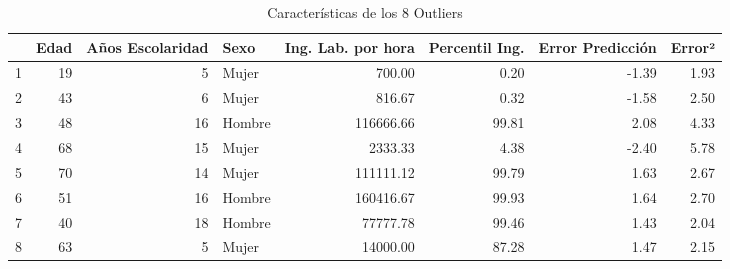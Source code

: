 \begin{table}[ht]
\centering
\begin{tabular}{rrrlrrrr}
  \toprule
 & Edad & Años Escolaridad & Sexo & Ing. Lab. por hora & Percentil Ing. & Error Predicción & Error² \\ 
  \midrule
1 &  19 &   5 & Mujer & 700.00 & 0.20 & -1.39 & 1.93 \\ 
  2 &  43 &   6 & Mujer & 816.67 & 0.32 & -1.58 & 2.50 \\ 
  3 &  48 &  16 & Hombre & 116666.66 & 99.81 & 2.08 & 4.33 \\ 
  4 &  68 &  15 & Mujer & 2333.33 & 4.38 & -2.40 & 5.78 \\ 
  5 &  70 &  14 & Mujer & 111111.12 & 99.79 & 1.63 & 2.67 \\ 
  6 &  51 &  16 & Hombre & 160416.67 & 99.93 & 1.64 & 2.70 \\ 
  7 &  40 &  18 & Hombre & 77777.78 & 99.46 & 1.43 & 2.04 \\ 
  8 &  63 &   5 & Mujer & 14000.00 & 87.28 & 1.47 & 2.15 \\ 
   \bottomrule
\end{tabular}
\caption{Características de los 8 Outliers} 
\end{table}
